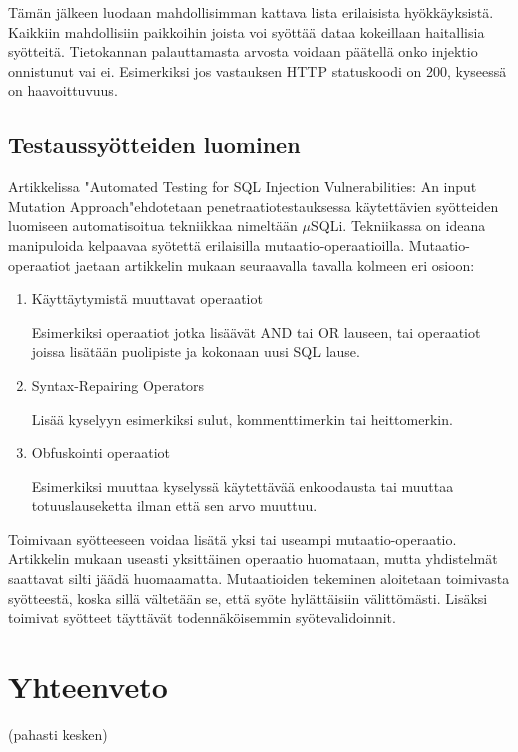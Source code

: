 \documentclass[finnish]{tktltiki2}
\theoremstyle{definition}
\theoremstyle{remark}
\begin{document}
	Tämän jälkeen luodaan mahdollisimman kattava lista erilaisista hyökkäyksistä. Kaikkiin mahdollisiin paikkoihin joista voi syöttää dataa kokeillaan haitallisia syötteitä. Tietokannan palauttamasta arvosta voidaan päätellä onko injektio onnistunut vai ei. Esimerkiksi jos vastauksen HTTP statuskoodi on 200, kyseessä on haavoittuvuus.
	
	\subsection{Testaussyötteiden luominen}
	Artikkelissa "Automated Testing for SQL Injection Vulnerabilities: An input Mutation Approach"\cite{generation}\space ehdotetaan penetraatiotestauksessa käytettävien syötteiden luomiseen automatisoitua tekniikkaa nimeltään $\mu$SQLi. Tekniikassa on ideana manipuloida kelpaavaa syötettä erilaisilla mutaatio-operaatioilla. Mutaatio-operaatiot jaetaan artikkelin mukaan seuraavalla tavalla kolmeen eri osioon:
	\begin{enumerate}
	\item Käyttäytymistä muuttavat operaatiot
	
	Esimerkiksi operaatiot jotka lisäävät AND tai OR lauseen, tai operaatiot joissa lisätään puolipiste ja kokonaan uusi SQL lause. 
	
	\item Syntax-Repairing Operators
	
	Lisää kyselyyn esimerkiksi sulut, kommenttimerkin tai heittomerkin.
	
	\item Obfuskointi operaatiot
	
	Esimerkiksi muuttaa kyselyssä käytettävää enkoodausta tai muuttaa totuuslauseketta ilman että sen arvo muuttuu.
	\end{enumerate}
	
	Toimivaan syötteeseen voidaa lisätä yksi tai useampi mutaatio-operaatio. Artikkelin mukaan useasti yksittäinen operaatio huomataan, mutta yhdistelmät saattavat silti jäädä huomaamatta. Mutaatioiden tekeminen aloitetaan toimivasta syötteestä, koska sillä vältetään se, että syöte hylättäisiin välittömästi. Lisäksi toimivat syötteet täyttävät todennäköisemmin syötevalidoinnit. 
	
	
	
	\section {Yhteenveto}
	(pahasti kesken)
	
\end{document}
